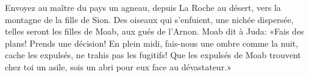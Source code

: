 Envoyez au maître du pays un agneau,
	depuis La Roche au désert, vers la montagne de la fille de Sion.
Des oiseaux qui s’enfuient, une nichée dispersée,
	telles seront les filles de Moab, aux gués de l’Arnon.
Moab dit à Juda: «Fais des plans! Prends une décision!
	En plein midi, fais-nous une ombre comme la nuit,
	cache les expulsés, ne trahis pas les fugitifs!
Que les expulsés de Moab trouvent chez toi un asile,
	sois un abri pour eux face au dévastateur.»
